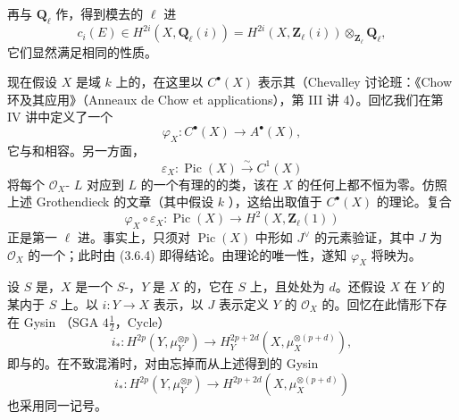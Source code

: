 再与 $\mathbf Q_\ell$ 作，得到模去的 $\ell$ 进
\[
 c_i(E)\in H^{2i}(X,\mathbf Q_\ell(i))
 =H^{2i}(X,\mathbf Z_\ell(i))\otimes_{\mathbf Z_\ell}\mathbf Q_\ell,
\]
它们显然满足相同的性质。

现在假设 $X$ 是域 $k$ 上的，在这里以 $C^\bullet(X)$ 表示其（Chevalley 讨论班：《Chow 环及其应用》（Anneaux de Chow et applications），第 III 讲 4）。回忆我们在第 IV 讲中定义了一个
\[
 \varphi_X:C^\bullet(X)\longrightarrow A^\bullet(X),
\]
它与和相容。另一方面，
\[
 \varepsilon_X:\operatorname{Pic}(X)\xrightarrow{\sim}C^1(X)
\]
将每个 $\mathscr O_X$- $L$ 对应到 $L$ 的一个有理的的类，该在 $X$ 的任何上都不恒为零。仿照上述 Grothendieck 的文章（其中假设 $k$ ），这给出取值于 $C^\bullet(X)$ 的理论。复合
\[
 \varphi_X\circ\varepsilon_X:\operatorname{Pic}(X)\longrightarrow H^2(X,\mathbf Z_\ell(1))
\]
正是第一 $\ell$ 进。事实上，只须对 $\operatorname{Pic}(X)$ 中形如 $J^\vee$ 的元素验证，其中 $J$ 为 $\mathscr O_X$ 的一个；此时由 (3.6.4) 即得结论。由理论的唯一性，遂知 $\varphi_X$ 将映为。

设 $S$ 是，$X$ 是一个 $S$-，$Y$ 是 $X$ 的，它在 $S$ 上，且处处为 $d$。还假设 $X$ 在 $Y$ 的某内于 $S$ 上。以 $i:Y\to X$ 表示，以 $J$ 表示定义 $Y$ 的 $\mathscr O_X$ 的。回忆在此情形下存在 Gysin （SGA $4\frac12$，Cycle）
\[
 i_*:H^{2p}(Y,\mu_Y^{\otimes p})\longrightarrow H_Y^{2p+2d}(X,\mu_X^{\otimes(p+d)}),
\]
即与的。在不致混淆时，对由忘掉而从上述得到的 Gysin 
\[
 i_*:H^{2p}(Y,\mu_Y^{\otimes p})\longrightarrow H^{2p+2d}(X,\mu_X^{\otimes(p+d)})
\]
也采用同一记号。

